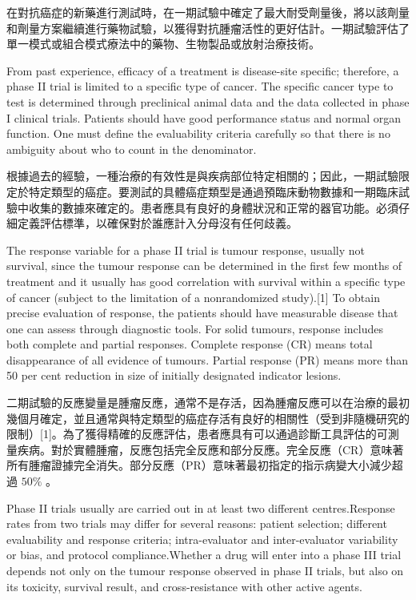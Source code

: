 在對抗癌症的新藥進行測試時，在一期試驗中確定了最大耐受劑量後，將以該劑量和劑量方案繼續進行藥物試驗，以獲得對抗腫瘤活性的更好估計。一期試驗評估了單一模式或組合模式療法中的藥物、生物製品或放射治療技術。
	
From past experience, efficacy of a treatment is disease-site specific; therefore, a phase II trial is limited to a specific type of cancer. The specific cancer type to test is determined through preclinical animal data and the data collected in phase I clinical trials. Patients should have good performance status and normal organ function. One must define the evaluability criteria carefully so that there is no ambiguity about who to count in the denominator.

根據過去的經驗，一種治療的有效性是與疾病部位特定相關的；因此，一期試驗限定於特定類型的癌症。要測試的具體癌症類型是通過預臨床動物數據和一期臨床試驗中收集的數據來確定的。患者應具有良好的身體狀況和正常的器官功能。必須仔細定義評估標準，以確保對於誰應計入分母沒有任何歧義。

The response variable for a phase II trial is tumour response, usually not survival, since the tumour response can be determined in the first few months of treatment and it usually has good correlation with survival within a specific type of cancer (subject to the limitation of a nonrandomized study).[1] To obtain precise evaluation of response, the patients should have measurable disease that one can assess through diagnostic tools. For solid tumours, response includes both complete and partial responses. Complete response (CR) means total disappearance of all evidence of tumours. Partial response (PR) means more than 50 per cent reduction in size of initially designated indicator lesions.

二期試驗的反應變量是腫瘤反應，通常不是存活，因為腫瘤反應可以在治療的最初幾個月確定，並且通常與特定類型的癌症存活有良好的相關性（受到非隨機研究的限制）[1]。為了獲得精確的反應評估，患者應具有可以通過診斷工具評估的可測量疾病。對於實體腫瘤，反應包括完全反應和部分反應。完全反應（CR）意味著所有腫瘤證據完全消失。部分反應（PR）意味著最初指定的指示病變大小減少超過 $50\%$ 。

Phase II trials usually are carried out in at least two different centres.Response rates from two trials may differ for several reasons: patient selection; different evaluability and response criteria; intra-evaluator and inter-evaluator variability or bias, and protocol compliance.Whether a drug will enter into a phase III trial depends not only on the tumour response observed in phase II trials, but also on its toxicity, survival result, and cross-resistance with other active agents.

